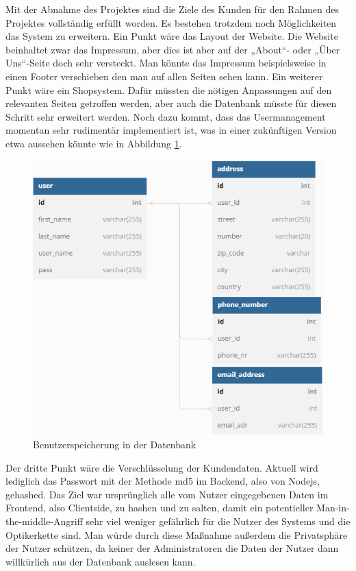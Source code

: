 Mit der Abnahme des Projektes sind die Ziele des Kunden für den Rahmen des Projektes vollständig erfüllt worden. Es bestehen trotzdem noch Möglichkeiten das System zu erweitern. Ein Punkt wäre das Layout der Website. Die Website beinhaltet zwar das Impressum, aber dies ist aber auf der „About“- oder „Über Uns“-Seite doch sehr versteckt. Man könnte das Impressum beispielsweise in einen Footer verschieben den man auf allen Seiten sehen kann. Ein weiterer Punkt wäre ein Shopsystem. Dafür müssten die nötigen Anpassungen auf den relevanten Seiten getroffen werden, aber auch die Datenbank müsste für diesen Schritt sehr erweitert werden. Noch dazu kommt, dass das Usermanagement momentan sehr rudimentär implementiert ist, was in einer zukünftigen Version etwa aussehen könnte wie in Abbildung \ref{fig:benutzerspeicherung_datenbank}.

\begin{figure}[h]
	\centering
	\includegraphics[width=15cm]{images/DatabaseSchemeFuture.png}
	\caption[Benutzerspeicherung Datenbank]{Benutzerspeicherung in der Datenbank}
	\label{fig:benutzerspeicherung_datenbank}
\end{figure}

Der dritte Punkt wäre die Verschlüsselung der Kundendaten. Aktuell wird lediglich das Passwort mit der Methode md5 im Backend, also von Nodejs, gehashed. Das Ziel war ursprünglich alle vom Nutzer eingegebenen Daten im Frontend, also Clientside, zu hashen und zu salten, damit ein potentieller Man-in-the-middle-Angriff sehr viel weniger gefährlich für die Nutzer des Systems und die Optikerkette sind. Man würde durch diese Maßnahme außerdem die Privatsphäre der Nutzer schützen, da keiner der Administratoren die Daten der Nutzer dann willkürlich aus der Datenbank auslesen kann.
